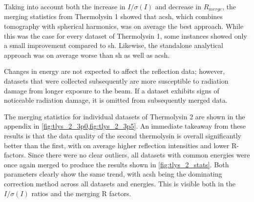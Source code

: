 Taking into account both the increase in $I/\sigma(I)$ and decrease in $R_{merge}$, the merging statistics from Thermolysin 1 showed that \ac{acsh}, which combines tomography with spherical harmonics, was on average the best approach. While this was the case for every dataset of Thermolysin 1, some instances showed only a small improvement compared to \ac{sh}. Likewise, the standalone analytical approach was on average worse than \ac{sh} as well as \ac{acsh}.

Changes in energy are not expected to affect the reflection data; however, datasets that were collected subsequently are more susceptible to radiation damage from longer exposure to the beam. If a dataset exhibits signs of noticeable radiation damage, it is omitted from subsequently merged data.%


The merging statistics for individual datasets of Thermolysin 2 are shown in the appendix in \cref{fig:tlys_2_3p0,fig:tlys_2_3p5}. An immediate takeaway from these results is that the data quality of the second thermolysin is overall significantly better than the first, with on average higher reflection intensities and lower R-factors. Since there were no clear outliers, all datasets with common energies were once again merged to produce the results shown in \cref{fig:tlys_2_stats}. Both parameters clearly show the same trend, with \ac{acsh} being the dominating correction method across all datasets and energies. This is visible both in the $I/\sigma(I)$ ratios and the merging R factors.

